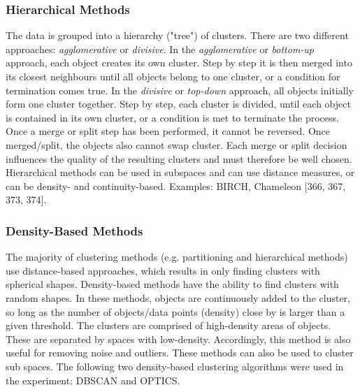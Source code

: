   \subsubsection{Hierarchical Methods}
  The data is grouped into a hierarchy ("tree") of clusters. There are two different approaches: \textit{agglomerative} or \textit{divisive}. In the \textit{agglomerative} or \textit{bottom-up} approach, each object creates its own cluster. Step by step it is then merged into its closest neighbours until all objects belong to one cluster, or a condition for termination comes true. In the \textit{divisive} or \textit{top-down} approach, all objects initially form one cluster together. Step by step, each cluster is divided, until each object is contained in its own cluster, or a condition is met to terminate the process. Once a merge or split step has been performed, it cannot be reversed. Once merged/split, the objects also cannot swap cluster. Each merge or split decision influences the quality of the resulting clusters and must therefore be well chosen. Hierarchical methods can be used in subspaces and can use distance measures, or can be density- and continuity-based. Examples: BIRCH, Chameleon \autocite{han2011data}[366, 367, 373, 374].


  
  

  \subsubsection{Density-Based Methods}
  \label{section:densityBasedMethods}
  The majority of clustering methods (e.g. partitioning and hierarchical methods) use distance-based approaches, which results in only finding clusters with spherical shapes. Density-based methods have the ability to find clusters with random shapes. In these methods, objects are continuously added to the cluster, so long as the number of objects/data points (density) close by is larger than a given threshold. The clusters are comprised of high-density areas of objects. These are separated by spaces with low-density. Accordingly, this method is also useful for removing noise and outliers. These methods can also be used to cluster sub spaces. The following two density-based clustering algorithms were used in the experiment: DBSCAN and OPTICS.

